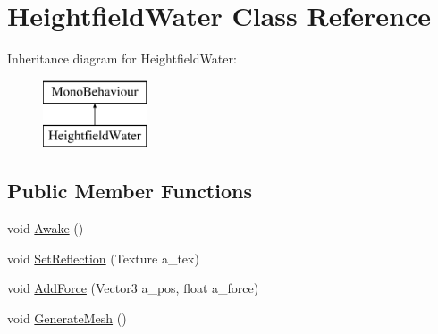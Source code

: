 \hypertarget{class_heightfield_water}{}\section{Heightfield\+Water Class Reference}
\label{class_heightfield_water}
Inheritance diagram for Heightfield\+Water\+:\begin{figure}[H]
\begin{center}
\leavevmode
\includegraphics[height=2.000000cm]{class_heightfield_water}
\end{center}
\end{figure}
\subsection*{Public Member Functions}
\begin{DoxyCompactItemize}
\item 
void \mbox{\hyperlink{class_heightfield_water_a33ef9ac32019943dda4367a4f46c9813}{Awake}} ()
\item 
void \mbox{\hyperlink{class_heightfield_water_a905688cd369050cdbeb2c836e5a5d681}{Set\+Reflection}} (Texture a\+\_\+tex)
\item 
void \mbox{\hyperlink{class_heightfield_water_a94779279bbfc71272e80cd4e3d258b12}{Add\+Force}} (Vector3 a\+\_\+pos, float a\+\_\+force)
\item 
void \mbox{\hyperlink{class_heightfield_water_a5cf2fe5311c065073a9903058d0dc8ef}{Generate\+Mesh}} ()
\end{DoxyCompactItemize}
